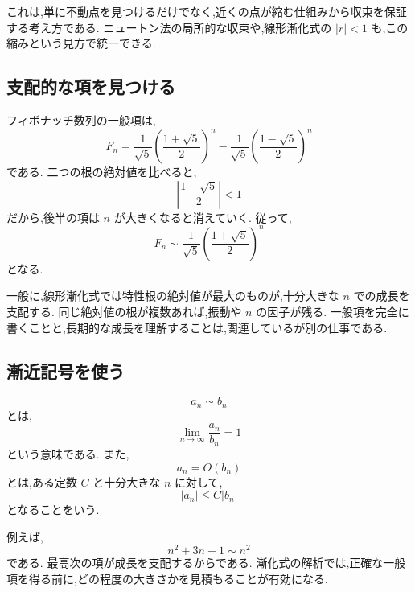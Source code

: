 これは,単に不動点を見つけるだけでなく,近くの点が縮む仕組みから収束を保証する考え方である.
ニュートン法の局所的な収束や,線形漸化式の $|r|<1$ も,この縮みという見方で統一できる.

\subsection{支配的な項を見つける}

フィボナッチ数列の一般項は,
\[
  F_n=\frac1{\sqrt5}\left(\frac{1+\sqrt5}{2}\right)^n
  -\frac1{\sqrt5}\left(\frac{1-\sqrt5}{2}\right)^n
\]
である.
二つの根の絶対値を比べると,
\[
  \left|\frac{1-\sqrt5}{2}\right|<1
\]
だから,後半の項は $n$ が大きくなると消えていく.
従って,
\[
  F_n\sim
  \frac1{\sqrt5}
  \left(\frac{1+\sqrt5}{2}\right)^n
\]
となる.

一般に,線形漸化式では特性根の絶対値が最大のものが,十分大きな $n$ での成長を支配する.
同じ絶対値の根が複数あれば,振動や $n$ の因子が残る.
一般項を完全に書くことと,長期的な成長を理解することは,関連しているが別の仕事である.

\subsection{漸近記号を使う}

\[
  a_n\sim b_n
\]
とは,
\[
  \lim_{n\to\infty}\frac{a_n}{b_n}=1
\]
という意味である.
また,
\[
  a_n=O(b_n)
\]
とは,ある定数 $C$ と十分大きな $n$ に対して,
\[
  |a_n|\leq C|b_n|
\]
となることをいう.

例えば,
\[
  n^2+3n+1\sim n^2
\]
である.
最高次の項が成長を支配するからである.
漸化式の解析では,正確な一般項を得る前に,どの程度の大きさかを見積もることが有効になる.
